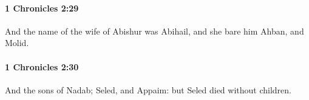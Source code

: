 		\paragraph{1 Chronicles 2:29} %
			\label{1CHRONICLES-2-29}

			And the name of the wife of Abishur was Abihail, and she bare him Ahban, and Molid.


		\paragraph{1 Chronicles 2:30} %
			\label{1CHRONICLES-2-30}

			And the sons of Nadab; Seled, and Appaim: but Seled died without children.



